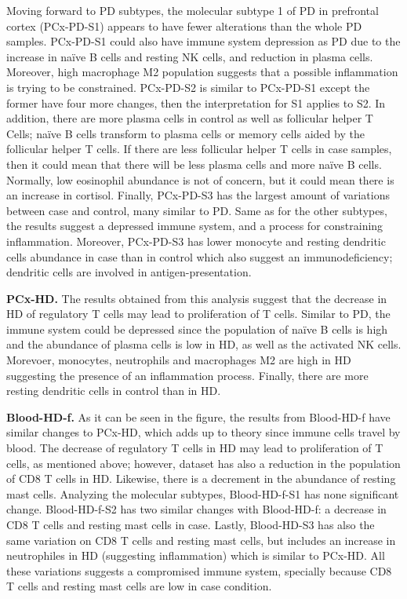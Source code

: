 Moving forward to PD subtypes, the molecular subtype 1 of PD in prefrontal cortex (PCx-PD-S1) appears to have fewer alterations than the whole PD samples. PCx-PD-S1 could also have immune system depression as PD due to the increase in naïve B cells and resting NK cells, and reduction in plasma cells. Moreover, high macrophage M2 population suggests that a possible inflammation is trying to be constrained. PCx-PD-S2 is similar to PCx-PD-S1 except the former have four more changes, then the interpretation for S1 applies to S2. In addition, there are more plasma cells in control as well as follicular helper T Cells; naïve B cells transform to plasma cells or memory cells aided by the follicular helper T cells. If there are less follicular helper T cells in case samples, then it could mean that there will be less plasma cells and more naïve B cells. Normally, low eosinophil abundance is not of concern, but it could mean there is an increase in cortisol. Finally, PCx-PD-S3 has the largest amount of variations between case and control, many similar to PD. Same as for the other subtypes, the results suggest a depressed immune system, and a process for constraining inflammation. Moreover, PCx-PD-S3 has lower monocyte and resting dendritic cells abundance in case than in control which also suggest an immunodeficiency; dendritic cells are involved in antigen-presentation.

\textbf{PCx-HD.} The results obtained from this analysis suggest that the decrease in HD of regulatory T cells may lead to proliferation of T cells. Similar to PD, the immune system could be depressed since the population of naïve B cells is high and the abundance of plasma cells is low in HD, as well as the activated NK cells. Morevoer, monocytes, neutrophils and macrophages M2 are high in HD suggesting the presence of an inflammation process. Finally, there are more resting dendritic cells in control than in HD.

\textbf{Blood-HD-f.} As it can be seen in the figure, the results from Blood-HD-f have similar changes to PCx-HD, which adds up to theory since immune cells travel by blood. The decrease of regulatory T cells in HD may lead to proliferation of T cells, as mentioned above; however, dataset has also a reduction in the population of CD8 T cells in HD. Likewise, there is a decrement in the abundance of resting mast cells. Analyzing the molecular subtypes, Blood-HD-f-S1 has none significant change. Blood-HD-f-S2 has two similar changes with Blood-HD-f: a decrease in CD8 T cells and resting mast cells in case. Lastly, Blood-HD-S3 has also the same variation on CD8 T cells and resting mast cells, but includes an increase in neutrophiles in HD (suggesting inflammation) which is similar to PCx-HD. All these variations suggests a compromised immune system, specially because CD8 T cells and resting mast cells are low in case condition.

